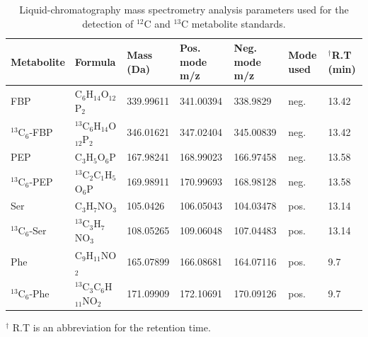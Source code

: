\begin{table}
%
%
%
\begin{tabular}{@{}lllllll@{}}
\toprule
Metabolite & Formula & Mass (Da) & Pos. mode m/z & Neg. mode m/z & Mode used & $^{\dagger}$R.T (min) \\ \midrule
FBP & C$_6$H$_{14}$O$_{12}$P$_2$ & 339.99611 & 341.00394 & 338.9829 & neg. & 13.42 \\
$^{13}$C$_{6}$-FBP & $^{13}$C$_6$H$_{14}$O$_{12}$P$_2$ & 346.01621 & 347.02404 & 345.00839 & neg. & 13.42 \\
PEP & C$_3$H$_{5}$O$_{6}$P & 167.98241 & 168.99023 & 166.97458 & neg. & 13.58 \\
$^{13}$C$_{6}$-PEP & $^{13}$C$_2$C$_1$H$_{5}$O$_{6}$P & 169.98911 & 170.99693 & 168.98128 & neg. & 13.58 \\
Ser & C$_3$H$_7$NO$_3$ & 105.0426 & 106.05043 & 104.03478 & pos. & 13.14 \\
$^{13}$C$_{6}$-Ser & $^{13}$C$_3$H$_7$NO$_3$ & 108.05265 & 109.06048 & 107.04483 & pos. & 13.14 \\
Phe & C$_9$H$_{11}$NO$_2$ & 165.07899 & 166.08681 & 164.07116 & pos. & 9.7 \\
$^{13}$C$_{6}$-Phe & $^{13}$C$_3$C$_6$H$_{11}$NO$_2$ & 171.09909 & 172.10691 & 170.09126 & pos. & 9.7 \\ \bottomrule
\end{tabular}
\caption{Liquid-chromatography mass spectrometry analysis parameters used for the detection of $^{12}$C and $^{13}$C metabolite standards.} {$^{\dagger}$ R.T is an abbreviation for the retention time.}
\end{table}

